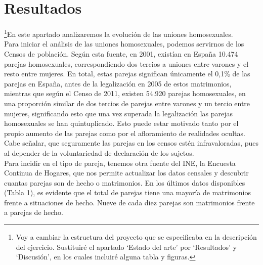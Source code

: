 \documentclass{article}
\begin{document}
\section{Resultados}
\footnote{Voy a cambiar la estructura del proyecto que se especificaba en la descripción del ejercicio. Sustituiré el apartado `Estado del arte' por `Resultados' y `Discusión', en los cuales incluiré alguna tabla y figuras.}En este apartado analizaremos la evolución de las uniones homosexuales.\\
Para iniciar el análisis de las uniones homosexuales, podemos servirnos de los Censos de población. Según esta fuente, en 2001, existían en España 10.474 parejas homosexuales, correspondiendo dos tercios a uniones entre varones y el resto entre mujeres. En total, estas parejas significan únicamente el 0,1\% de las parejas en España, antes de la legalización en 2005 de estos matrimonios, mientras que según el Censo de 2011, existen 54.920 parejas homosexuales, en una proporción similar de dos tercios de
parejas entre varones y un tercio entre mujeres, significando esto que una vez superada la legalización las parejas homosexuales se han quintuplicado. Esto puede estar
motivado tanto por el propio aumento de las parejas como por el afloramiento de realidades ocultas. Cabe señalar, que seguramente las parejas en los censos estén infravaloradas, pues al depender de la voluntariedad de declaración de los sujetos.
\\

Para incidir en el tipo de pareja, tenemos otra fuente del INE, la Encuesta Continua de Hogares, que nos permite actualizar los datos censales y descubrir cuantas parejas son de hecho o matrimonios. En los últimos datos disponibles (Tabla 1), es evidente que el total de parejas tiene una mayoría de matrimonios frente a situaciones de hecho. Nueve de cada diez parejas son matrimonios frente a parejas de hecho.
\\
\end{document}
